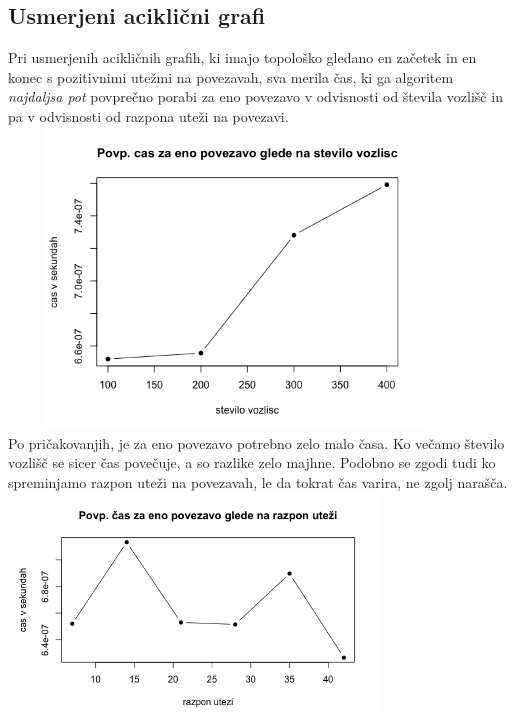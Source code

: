 \documentclass[a4paper, 9pt]{article}
\begin{document}
\subsection{Usmerjeni aciklični grafi}
Pri usmerjenih acikličnih grafih, ki imajo topološko gledano en začetek in en konec s pozitivnimi utežmi na povezavah, sva merila čas, ki ga algoritem \textit{najdaljsa pot} povprečno porabi za eno povezavo v odvisnosti od števila vozlišč in pa v odvisnosti od razpona uteži na povezavi. \\
\includegraphics[width = 12cm, height=8cm]{plot_v2.png}\\
Po pričakovanjih, je za eno povezavo potrebno zelo malo časa. Ko večamo število vozlišč se sicer čas povečuje, a so razlike zelo majhne. Podobno se zgodi tudi ko spreminjamo razpon uteži na povezavah, le da tokrat čas varira, ne zgolj narašča.\\
\includegraphics[width = 10cm, height = 6cm]{Rplot.png}
\end{document}
